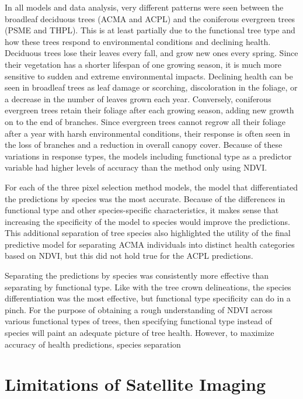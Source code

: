 \documentclass[12pt,twoside]{reedthesis}
\begin{document}
In all models and data analysis, very different patterns were seen
between the broadleaf deciduous trees (ACMA and ACPL) and the coniferous
evergreen trees (PSME and THPL). This is at least partially due to the
functional tree type and how these trees respond to environmental
conditions and declining health. Deciduous trees lose their leaves every
fall, and grow new ones every spring. Since their vegetation has a
shorter lifespan of one growing season, it is much more sensitive to
sudden and extreme environmental impacts. Declining health can be seen
in broadleaf trees as leaf damage or scorching, discoloration in the
foliage, or a decrease in the number of leaves grown each year.
Conversely, coniferous evergreen trees retain their foliage after each
growing season, adding new growth on to the end of branches. Since
evergreen trees cannot regrow all their foliage after a year with harsh
environmental conditions, their response is often seen in the loss of
branches and a reduction in overall canopy cover. Because of these
variations in response types, the models including functional type as a
predictor variable had higher levels of accuracy than the method only
using NDVI.

For each of the three pixel selection method models, the model that
differentiated the predictions by species was the most accurate. Because
of the differences in functional type and other species-specific
characteristics, it makes sense that increasing the specificity of the
model to species would improve the predictions. This additional
separation of tree species also highlighted the utility of the final
predictive model for separating ACMA individuals into distinct health
categories based on NDVI, but this did not hold true for the ACPL
predictions.

Separating the predictions by species was consistently more effective
than separating by functional type. Like with the tree crown
delineations, the species differentiation was the most effective, but
functional type specificity can do in a pinch. For the purpose of
obtaining a rough understanding of NDVI across various functional types
of trees, then specifying functional type instead of species will paint
an adequate picture of tree health. However, to maximize accuracy of
health predictions, species separation

\hypertarget{limitations-of-satellite-imaging}{%
\section{Limitations of Satellite Imaging}\label{limitations-of-satellite-imaging}}
\end{document}

